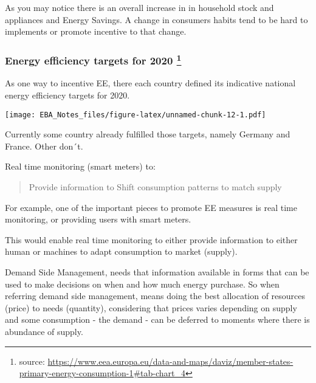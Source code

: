 \documentclass[]{book}
\let\rmarkdownfootnote\footnote%
\def\footnote{\protect\rmarkdownfootnote}
\theoremstyle{definition}
\theoremstyle{definition}
\theoremstyle{definition}
\theoremstyle{remark}
\begin{document}
As you may notice there is an overall increase in in household stock and
appliances and Energy Savings. A change in consumers habits tend to be
hard to implements or promote incentive to that change.

\subsubsection[Energy efficiency targets for 2020
]{\texorpdfstring{Energy efficiency targets for 2020 \footnote{source:
  \url{https://www.eea.europa.eu/data-and-maps/daviz/member-states-primary-energy-consumption-1\#tab-chart_4}}}{Energy efficiency targets for 2020 }}\label{energy-efficiency-targets-for-2020-11}

As one way to incentive EE, there each country defined its indicative
national energy efficiency targets for 2020.

\texttt{[image: EBA\_Notes\_files/figure-latex/unnamed-chunk-12-1.pdf]}

Currently some country already fulfilled those targets, namely Germany
and France. Other don´t.

Real time monitoring (smart meters) to:

\begin{quote}
Provide information to Shift consumption patterns to match supply
\end{quote}

For example, one of the important pieces to promote EE measures is real
time monitoring, or providing users with smart meters.

This would enable real time monitoring to either provide information to
either human or machines to adapt consumption to market (supply).

Demand Side Management, needs that information available in forms that
can be used to make decisions on when and how much energy purchase. So
when referring demand side management, means doing the best allocation
of resources (price) to needs (quantity), considering that prices varies
depending on supply and some consumption - the demand - can be deferred
to moments where there is abundance of supply.
\end{document}
